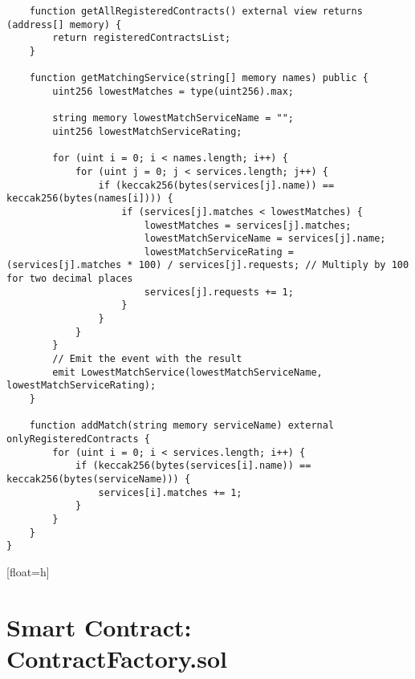 \begin{lstlisting}
    function getAllRegisteredContracts() external view returns (address[] memory) {
        return registeredContractsList;
    }

    function getMatchingService(string[] memory names) public {
        uint256 lowestMatches = type(uint256).max;

        string memory lowestMatchServiceName = "";
        uint256 lowestMatchServiceRating;

        for (uint i = 0; i < names.length; i++) {
            for (uint j = 0; j < services.length; j++) {
                if (keccak256(bytes(services[j].name)) == keccak256(bytes(names[i]))) {
                    if (services[j].matches < lowestMatches) {
                        lowestMatches = services[j].matches;
                        lowestMatchServiceName = services[j].name;
                        lowestMatchServiceRating = (services[j].matches * 100) / services[j].requests; // Multiply by 100 for two decimal places
                        services[j].requests += 1;
                    }
                }
            }
        }
        // Emit the event with the result
        emit LowestMatchService(lowestMatchServiceName, lowestMatchServiceRating);
    }

    function addMatch(string memory serviceName) external onlyRegisteredContracts {
        for (uint i = 0; i < services.length; i++) {
            if (keccak256(bytes(services[i].name)) == keccak256(bytes(serviceName))) {
                services[i].matches += 1;
            }
        }
    }
}
\end{lstlisting}[float=h]


\chapter{Smart Contract: ContractFactory.sol}
\lstset{
  basicstyle=\footnotesize\ttfamily,
  breaklines=true,
  numbers=left,
  firstnumber=1,
}


